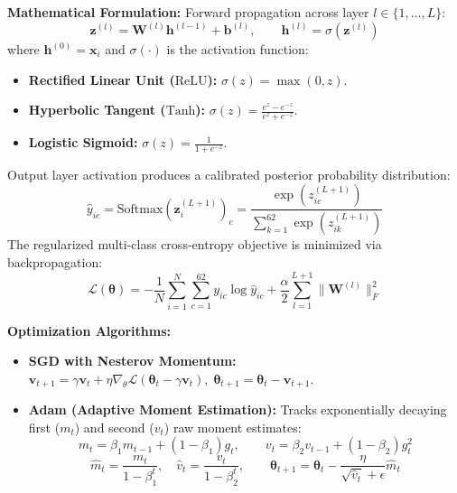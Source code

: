 \documentclass[12pt,a4paper]{article}
\begin{document}
\textbf{Mathematical Formulation:}
Forward propagation across layer $l \in \{1, \dots, L\}$:
\begin{equation}
\mathbf{z}^{(l)} = \mathbf{W}^{(l)} \mathbf{h}^{(l-1)} + \mathbf{b}^{(l)}, \qquad \mathbf{h}^{(l)} = \sigma\left(\mathbf{z}^{(l)}\right)
\end{equation}
where $\mathbf{h}^{(0)} = \mathbf{x}_i$ and $\sigma(\cdot)$ is the activation function:
\begin{itemize}[noitemsep]
    \item \textbf{Rectified Linear Unit ($\text{ReLU}$):} $\sigma(z) = \max(0, z)$.
    \item \textbf{Hyperbolic Tangent ($\text{Tanh}$):} $\sigma(z) = \frac{e^z - e^{-z}}{e^z + e^{-z}}$.
    \item \textbf{Logistic Sigmoid:} $\sigma(z) = \frac{1}{1 + e^{-z}}$.
\end{itemize}
Output layer activation produces a calibrated posterior probability distribution:
\begin{equation}
\hat{y}_{ic} = \text{Softmax}\left(\mathbf{z}_i^{(L+1)}\right)_c = \frac{\exp\left(z_{ic}^{(L+1)}\right)}{\sum_{k=1}^{62} \exp\left(z_{ik}^{(L+1)}\right)}
\end{equation}
The regularized multi-class cross-entropy objective is minimized via backpropagation:
\begin{equation}
\mathcal{L}(\boldsymbol{\theta}) = -\frac{1}{N} \sum_{i=1}^N \sum_{c=1}^{62} y_{ic} \log \hat{y}_{ic} + \frac{\alpha}{2} \sum_{l=1}^{L+1} \|\mathbf{W}^{(l)}\|_F^2
\end{equation}

\textbf{Optimization Algorithms:}
\begin{itemize}[noitemsep]
    \item \textbf{SGD with Nesterov Momentum:} $\mathbf{v}_{t+1} = \gamma \mathbf{v}_t + \eta \nabla_\theta \mathcal{L}(\boldsymbol{\theta}_t - \gamma \mathbf{v}_t), \; \boldsymbol{\theta}_{t+1} = \boldsymbol{\theta}_t - \mathbf{v}_{t+1}$.
    \item \textbf{Adam (Adaptive Moment Estimation):} Tracks exponentially decaying first ($m_t$) and second ($v_t$) raw moment estimates:
    \begin{equation}
    m_t = \beta_1 m_{t-1} + (1-\beta_1) g_t, \qquad v_t = \beta_2 v_{t-1} + (1-\beta_2) g_t^2
    \end{equation}
    \begin{equation}
    \hat{m}_t = \frac{m_t}{1 - \beta_1^t}, \quad \hat{v}_t = \frac{v_t}{1 - \beta_2^t}, \qquad \boldsymbol{\theta}_{t+1} = \boldsymbol{\theta}_t - \frac{\eta}{\sqrt{\hat{v}_t} + \epsilon} \hat{m}_t
    \end{equation}
\end{itemize}
\end{document}
